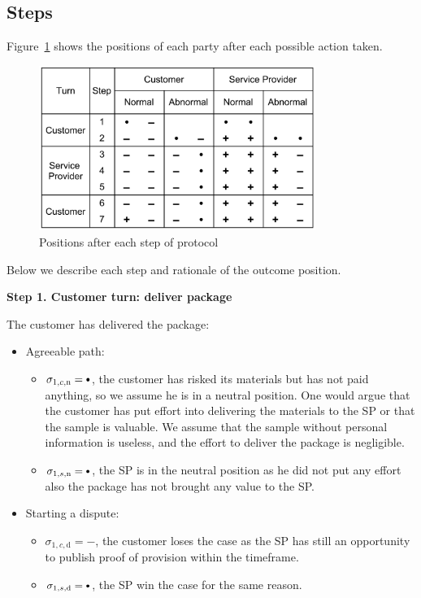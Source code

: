 \documentclass{ieeeaccess}
\newcommand\sbullet[1][.75]{\mathbin{\ThisStyle{\vcenter{\hbox{%
  \scalebox{#1}{$\SavedStyle\bullet$}}}}}%
}
\begin{document}
\subsection{Steps}\label{steps}

Figure~\ref{fig:positions} 
shows the positions of each party after each possible action taken.

\begin{figure}[h!]
\includegraphics[width=9cm]{formal-table-of-positions.png}
\centering
\caption{Positions after each step of protocol}
\label{fig:positions}
\end{figure}


Below we describe each step and rationale of the outcome position.


\noindent \textbf
{Step 1. Customer turn: deliver package}\label{step-1-deliver-package}

The customer has delivered the package:

\begin{itemize}
\item
  Agreeable path:

  \begin{itemize}
  
  \item
    \(\sigma_{1, c, \mathrm{n}} = \sbullet\), the customer has risked its materials but has not paid anything, so we assume he is in a neutral position. One would argue that the customer has put effort into delivering the materials to the SP or that the sample is valuable. We assume that the sample without personal information is useless, and the effort to deliver the package is negligible.
  \item
    \(\sigma_{1, s, \mathrm{n}} = \sbullet\), the SP is in the neutral position as he did not put any effort also the package has not brought any value to the SP.
  \end{itemize}
\item
  Starting a dispute:

  \begin{itemize}
  
  \item
    \(\sigma_{1, c, \mathrm{d}} = -\), the customer loses the case as the SP has still an opportunity to publish proof of provision within the timeframe.
  \item
    \(\sigma_{1, s, \mathrm{d}} = \sbullet\), the SP win the case for the same reason.
  \end{itemize}
\end{itemize}
\end{document}
